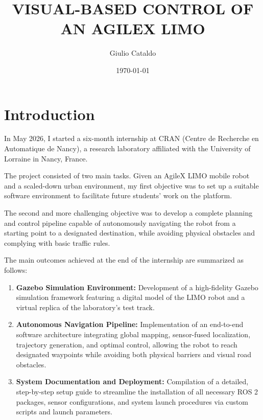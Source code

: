 \documentclass[a4paper,11pt,oneside]{book}
\title{VISUAL-BASED CONTROL OF AN AGILEX LIMO}
\author{Giulio Cataldo}
\date{\today}
\begin{document}
\frontmatter

\hypersetup{pageanchor=false}
\maketitle
\hypersetup{pageanchor=true}
\tableofcontents

\mainmatter


\chapter{Introduction}

In May 2026, I started a six-month internship at CRAN (Centre de Recherche en Automatique de Nancy), a research laboratory affiliated with the University of Lorraine in Nancy, France.

The project consisted of two main tasks. Given an AgileX LIMO mobile robot and a scaled-down urban environment, my first objective was to set up a suitable software environment to facilitate future students' work on the platform.

The second and more challenging objective was to develop a complete planning and control pipeline capable of autonomously navigating the robot from a starting point to a designated destination, while avoiding physical obstacles and complying with basic traffic rules.

The main outcomes achieved at the end of the internship are summarized as follows:

\begin{enumerate}
    \item \textbf{Gazebo Simulation Environment:}
    Development of a high-fidelity Gazebo simulation framework featuring a digital model of the LIMO robot and a virtual replica of the laboratory's test track.

    \item \textbf{Autonomous Navigation Pipeline:}
    Implementation of an end-to-end software architecture integrating global mapping, sensor-fused localization, trajectory generation, and optimal control, allowing the robot to reach designated waypoints while avoiding both physical barriers and visual road obstacles.

    \item \textbf{System Documentation and Deployment:}
    Compilation of a detailed, step-by-step setup guide to streamline the installation of all necessary ROS 2 packages, sensor configurations, and system launch procedures via custom scripts and launch parameters.
\end{enumerate}
\end{document}
